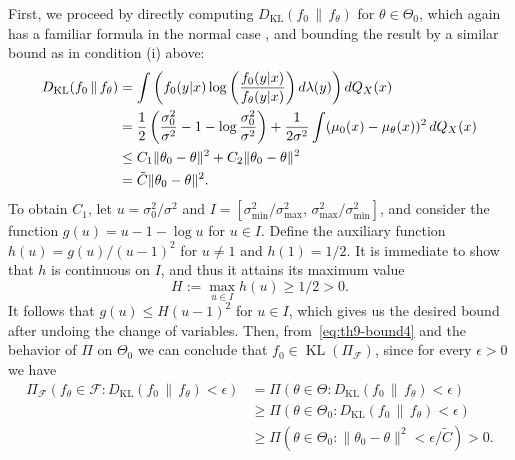 \noindent First, we proceed by directly computing \(D_{\mathrm{KL}}(f_0 \,\|\, f_\theta)\) for \(\theta\in\Theta_0\), which again has a familiar formula in the normal case \citep[e.g.][p.~47]{pardo2018statistical}, and bounding the result by a similar bound as in condition (i) above:
\begin{align}\label{eq:th9-bound4}
  D_{\mathrm{KL}}(f_0 \,\|\, f_\theta) & =  \int \left(f_0(y|x)\log\left(\frac{f_0(y|x)}{f_\theta(y|x)}\right)  d\lambda(y)\right)dQ_X(x)  \notag                                                              \\
                                       & = \frac{1}{2}\left(\frac{\sigma_0^2}{\sigma^2} - 1 - \log \frac{\sigma_0^2}{\sigma^2} \right) + \frac{1}{2\sigma^2}\int (\mu_0(x) - \mu_\theta(x))^2\, dQ_X(x) \notag \\
                                       & \leq C_1\|\theta_0 - \theta\|^2 + C_2\|\theta_0-\theta\|^2 \notag                                                                                                           \\
                                       & = \tilde C\|\theta_0 - \theta\|^2.
\end{align}
To obtain \(C_1\), let \(u=\sigma_0^2/\sigma^2\) and \(I=[\sigma^2_{\text{min}}/\sigma^2_\text{max},\, \sigma^2_{\text{max}}/\sigma^2_\text{min}]\), and consider the function \(g(u)=u - 1 - \log u\) for \(u\in I\). Define the auxiliary function \(h(u) = g(u)/(u-1)^2\) for \(u\neq 1\) and \(h(1)=1/2\). It is immediate to show that \(h\) is continuous on \(I\), and thus it attains its maximum value
\[H :=\max_{u \in I} h(u)\geq 1/2 > 0.
\]
It follows that \(g(u) \leq H (u-1)^2\) for \(u\in I\), which gives us the desired bound after undoing the change of variables. Then, from~\eqref{eq:th9-bound4} and the behavior of \(\Pi\) on \(\Theta_0\) we can conclude that \(f_0\in\operatorname{KL}(\Pi_{\mathcal F})\), since for every \(\epsilon>0\) we have
\begin{align*}
  \Pi_{\mathcal F}(f_\theta\in \mathcal F: D_{\mathrm{KL}}(f_0 \,\|\, f_\theta) < \epsilon) & =\Pi(\theta \in \Theta: D_{\mathrm{KL}}(f_0 \,\|\, f_\theta) < \epsilon)      \\
                                                                                            & \geq \Pi(\theta \in \Theta_0: D_{\mathrm{KL}}(f_0 \,\|\, f_\theta) <\epsilon) \\
                                                                                            & \geq \Pi(\theta\in\Theta_0: \|\theta_0 - \theta\|^2 < \epsilon/\tilde C) > 0.
\end{align*}


